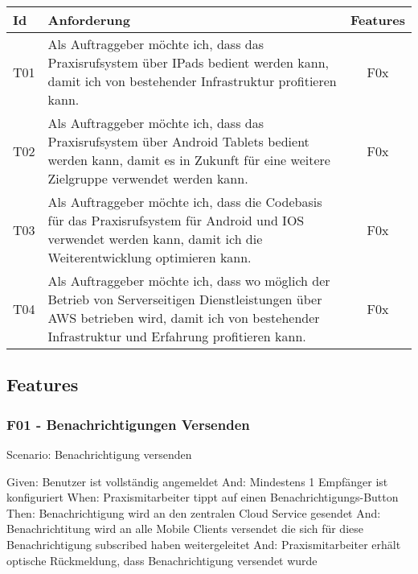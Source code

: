 \begin{table}[h]
    \centering
    \begin{tabular}{|l|p{13cm}|c|}
        \hline
        \textbf{Id} & \textbf{Anforderung}                                                              & \textbf{Features} \\
        \hline
        T01         & Als Auftraggeber möchte ich, dass das Praxisrufsystem über IPads bedient werden kann, damit ich von bestehender Infrastruktur profitieren kann. & F0x \\
        \hline
        T02         & Als Auftraggeber möchte ich, dass das Praxisrufsystem über Android Tablets bedient werden kann, damit es in Zukunft für eine weitere Zielgruppe verwendet werden kann. & F0x \\
        \hline
        T03         & Als Auftraggeber möchte ich, dass die Codebasis für das Praxisrufsystem für Android und IOS verwendet werden kann, damit ich die Weiterentwicklung optimieren kann. & F0x \\
        \hline
        T04         & Als Auftraggeber möchte ich, dass wo möglich der Betrieb von Serverseitigen Dienstleistungen über AWS betrieben wird, damit ich von bestehender Infrastruktur und Erfahrung profitieren kann. & F0x               \\
        \hline
    \end{tabular}\label{tab:userstories3}
\end{table}

\clearpage

\subsection{Features}\label{subsec:features}

    \subsubsection*{F01 - Benachrichtigungen Versenden}

        Scenario: Benachrichtigung versenden

        Given:  Benutzer ist vollständig angemeldet
        And:    Mindestens 1 Empfänger ist konfiguriert
        When:   Praxismitarbeiter tippt auf einen Benachrichtigungs-Button
        Then:   Benachrichtigung wird an den zentralen Cloud Service gesendet
        And:    Benachrichtitung wird an alle Mobile Clients versendet die sich für diese Benachrichtigung subscribed haben weitergeleitet
        And:    Praxismitarbeiter erhält optische Rückmeldung, dass Benachrichtigung versendet wurde


